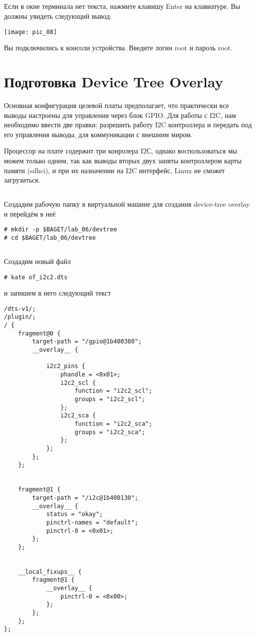 \subsection{}Если в окне терминала нет текста, нажмите клавишу Enter на клавиатуре. Вы должны увидеть следующий вывод:
\begin{center}
	\texttt{[image: pic\_08]}
\end{center}
Вы подключились к консоли устройства. Введите логин root и пароль root.


\section{Подготовка Device Tree Overlay}

Основная конфигурация целевой платы предполагает, что практически все выводы настроены для управления через блок GPIO. Для работы с I2C, нам необходимо ввести две правки: разрешить работу I2C контроллера и передать под его управления выводы, для коммуникации с внешним миром.  

Процессор на плате содержит три конролера I2С, однако воспользоваться мы можем только одним, так как выводы вторых двух заняты контроллером карты памяти (sdhci), и при их назначении на I2C интерфейс, Linux не сможет загрузиться.

\subsection{} Создадим рабочую папку в виртуальной машине для создания device-tree overlay и перейдём в неё 
\begin{lstlisting}[style=bash]
# mkdir -p $BAGET/lab_06/devtree
# cd $BAGET/lab_06/devtree 
\end{lstlisting}

\subsection{}Создадим новый файл
\begin{lstlisting}[style=bash]
# kate of_i2c2.dts
\end{lstlisting}
и запишем в него следующий текст
\begin{lstlisting}[style=stdout]
/dts-v1/;
/plugin/;
/ {
	fragment@0 {
		target-path = "/gpio@1b400380";
		__overlay__ {
			
			i2c2_pins {
				phandle = <0x01>;
				i2c2_scl {
					function = "i2c2_scl";
					groups = "i2c2_scl";
				};
				i2c2_sca {
					function = "i2c2_sca";
					groups = "i2c2_sca";
				};
			};
		};
	};
	
	
	fragment@1 { 
		target-path = "/i2c@1b400130"; 
		__overlay__ { 
			status = "okay"; 
			pinctrl-names = "default"; 
			pinctrl-0 = <0x01>; 
		}; 
	}; 
	
	
	__local_fixups__ {
		fragment@1 {
			__overlay__ {
				pinctrl-0 = <0x00>;
			};
		};	
	};
};
\end{lstlisting}

